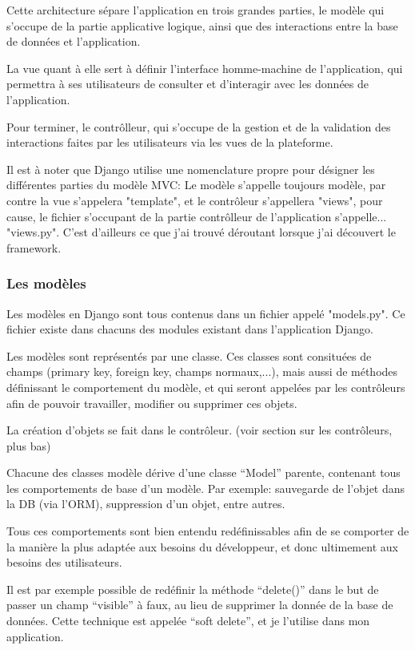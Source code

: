 \documentclass[12pt,table,a4paper]{report}
\begin{document}
Cette architecture sépare l'application en trois grandes parties, le modèle qui s'occupe de la partie applicative logique, ainsi que des interactions entre la base de données et l'application.

La vue quant à elle sert à définir l'interface homme-machine de l'application, qui permettra à ses utilisateurs de consulter et d'interagir avec les données de l'application.

Pour terminer, le contrôlleur, qui s'occupe de la gestion et de la validation des interactions faites par les utilisateurs via les vues de la plateforme.

Il est à noter que Django utilise une nomenclature propre pour désigner les différentes parties du modèle MVC: Le modèle s'appelle toujours modèle, par contre la vue s'appelera "template", et le contrôleur s'appellera "views", pour cause, le fichier s'occupant de la partie contrôlleur de l'application s'appelle... "views.py". C'est d'ailleurs ce que j'ai trouvé déroutant lorsque j'ai découvert le framework.

\subsubsection{Les modèles}
Les modèles en Django sont tous contenus dans un fichier appelé "models.py". Ce fichier existe dans chacuns des modules existant dans l'application Django.

Les modèles sont représentés par une classe. Ces classes sont consituées de champs (primary key, foreign key, champs normaux,...), mais aussi de méthodes définissant le comportement du modèle, et qui seront appelées par les contrôleurs afin de pouvoir travailler, modifier ou supprimer ces objets.

La création d'objets se fait dans le contrôleur. (voir section sur les contrôleurs, plus bas)

Chacune des classes modèle dérive d'une classe "`Model"' parente, contenant tous les comportements de base d'un modèle. Par exemple: sauvegarde de l'objet dans la DB (via l'ORM), suppression d'un objet, entre autres.

Tous ces comportements sont bien entendu redéfinissables afin de se comporter de la manière la plus adaptée aux besoins du développeur, et donc ultimement aux besoins des utilisateurs.

Il est par exemple possible de redéfinir la méthode "`delete()"' dans le but de passer un champ "`visible"' à faux, au lieu de supprimer la donnée de la base de données. Cette technique est appelée "`soft delete"', et je l'utilise dans mon application.
\end{document}
